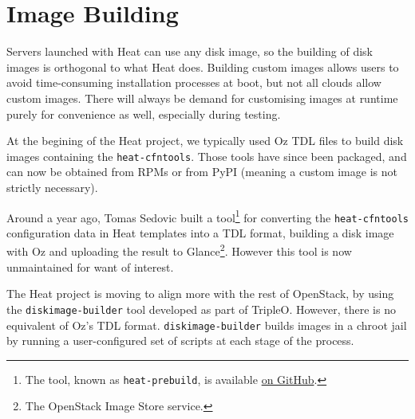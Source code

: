 \section{Image Building}

Servers launched with Heat can use any disk image, so the building of disk images is orthogonal to what Heat does. Building custom images allows users to avoid time-consuming installation processes at boot, but not all clouds allow custom images. There will always be demand for customising images at runtime purely for convenience as well, especially during testing.

At the begining of the Heat project, we typically used Oz TDL files to build disk images containing the \texttt{heat-cfntools}. Those tools have since been packaged, and can now be obtained from RPMs or from PyPI (meaning a custom image is not strictly necessary).

Around a year ago, Tomas Sedovic built a tool\footnote{The tool, known as \texttt{heat-prebuild}, is available \href{https://github.com/sdake/heat-prebuild}{on GitHub}.} for converting the \texttt{heat-cfntools} configuration data in Heat templates into a TDL format, building a disk image with Oz and uploading the result to Glance\footnote{The OpenStack Image Store service.}. However this tool is now unmaintained for want of interest.

The Heat project is moving to align more with the rest of OpenStack, by using the \texttt{diskimage-builder} tool developed as part of TripleO. However, there is no equivalent of Oz's TDL format. \texttt{diskimage-builder} builds images in a chroot jail by running a user-configured set of scripts at each stage of the process.
